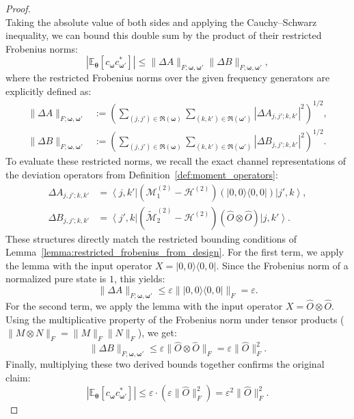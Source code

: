 \documentclass[%
 reprint,
 amsmath,amssymb,
 aps,
 pra,
]{revtex4-2}
\theoremstyle{definition}
\begin{document}
\begin{proof}
\begin{equation}
\end{equation}
Taking the absolute value of both sides and applying the Cauchy--Schwarz inequality, we can bound this double sum by the product of their restricted Frobenius norms:
\begin{equation}
\left| \mathbb{E}_{\bm{\theta}} \left[ c_{\bm{\omega}}c_{\bm{\omega}'}^* \right] \right|
\leq
\|\Delta A\|_{F;\bm{\omega},\bm{\omega}'} \|\Delta B\|_{F;\bm{\omega},\bm{\omega}'},
\end{equation}
where the restricted Frobenius norms over the given frequency generators are explicitly defined as:
\begin{align}
\|\Delta A\|_{F;\bm{\omega},\bm{\omega}'}
&:=
\left( \sum_{(j,j')\in\mathfrak R(\bm{\omega})} \sum_{(k,k')\in\mathfrak R(\bm{\omega}')} |\Delta A_{j,j';k,k'}|^2 \right)^{1/2}, \\
\|\Delta B\|_{F;\bm{\omega},\bm{\omega}'}
&:=
\left( \sum_{(j,j')\in\mathfrak R(\bm{\omega})} \sum_{(k,k')\in\mathfrak R(\bm{\omega}')} |\Delta B_{j,j';k,k'}|^2 \right)^{1/2}.
\end{align}
To evaluate these restricted norms, we recall the exact channel representations of the deviation operators from Definition~\ref{def:moment_operators}:
\begin{align*}
\Delta A_{j,j';k,k'} &= \left\langle j,k'\right| \left( \mathcal M^{(2)}_1-\mathcal H^{(2)} \right) \left( |0,0\rangle\langle0,0| \right) \left|j',k\right\rangle, \\
\Delta B_{j,j';k,k'} &= \left\langle j',k\right| \left( \widetilde{\mathcal M}^{(2)}_2-\mathcal H^{(2)} \right) \left( \hat O\otimes\hat O \right) \left|j,k'\right\rangle.
\end{align*}
These structures directly match the restricted bounding conditions of Lemma~\ref{lemma:restricted_frobenius_from_design}. For the first term, we apply the lemma with the input operator $X=|0,0\rangle\langle0,0|$. Since the Frobenius norm of a normalized pure state is $1$, this yields:
\begin{equation}
\|\Delta A\|_{F;\bm{\omega},\bm{\omega}'} \leq \varepsilon \| |0,0\rangle\langle0,0| \|_F = \varepsilon.
\end{equation}
For the second term, we apply the lemma with the input operator $X=\hat O\otimes\hat O$. Using the multiplicative property of the Frobenius norm under tensor products ($\|M \otimes N\|_F = \|M\|_F \|N\|_F$), we get:
\begin{equation}
\|\Delta B\|_{F;\bm{\omega},\bm{\omega}'} \leq \varepsilon \|\hat O\otimes\hat O\|_F = \varepsilon \|\hat O\|_F^2.
\end{equation}
Finally, multiplying these two derived bounds together confirms the original claim:
\begin{equation}
\left| \mathbb{E}_{\bm{\theta}} \left[ c_{\bm{\omega}}c_{\bm{\omega}'}^* \right] \right|
\leq
\varepsilon \cdot \left( \varepsilon\|\hat O\|_F^2 \right)
=
\varepsilon^2 \|\hat O\|_F^2.
\end{equation}

\end{proof}
\end{document}

